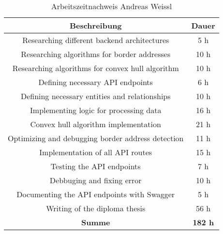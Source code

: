 \begin{table}[H]
  \centering
  \begin{tabular}{|c|c|}
  \hline
  \multicolumn{1}{|c|}{\textbf{Beschreibung}}  &
  \multicolumn{1}{c|}{\textbf{Dauer}}  \\ \hline
    Researching different backend architectures & 5 h \\ \hline
    Researching algorithms for border addresses & 10 h \\ \hline
    Researching algorithms for convex hull algorithm & 10 h \\ \hline
    Defining necessary API endpoints & 6 h \\ \hline
    Defining necessary entities and relationships & 10 h \\ \hline
    Implementing logic for processing data & 16 h \\ \hline
    Convex hull algorithm implementation & 21 h \\ \hline
    Optimizing and debugging border address detection & 11 h \\ \hline
    Implementation of all API routes & 15 h \\ \hline
    Testing the API endpoints & 7 h \\ \hline
    Debbuging and fixing error & 10 h \\ \hline
    Documenting the API endpoints with Swagger & 5 h \\ \hline
    Writing of the diploma thesis & 56 h \\ \hline
    {\textbf{Summe}} & \textbf{182 h} \\ \hline
   \end{tabular}
  \caption{Arbeitszeitnachweis Andreas Weissl}
  \end{table}

\newpage




 
